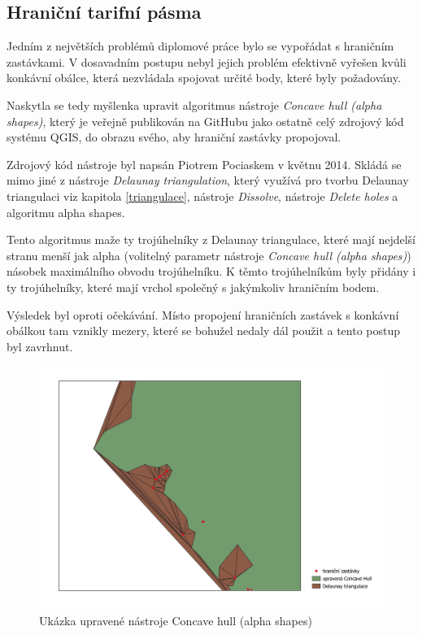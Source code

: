 \subsection{Hraniční tarifní pásma}
\label{hranice}

Jedním z největších problémů diplomové práce bylo se vypořádat s hraničním zastávkami.
V dosavadním postupu nebyl jejich problém efektivně vyřešen kvůli konkávní obálce,
která nezvládala spojovat určité body, které byly požadovány.

Naskytla se tedy myšlenka upravit algoritmus nástroje \textit{Concave hull (alpha shapes)},
který je veřejně publikován na GitHubu jako ostatně celý zdrojový kód systému QGIS, do obrazu
svého, aby hraniční zastávky propojoval. 

Zdrojový kód nástroje byl napsán Piotrem Pociaskem v květnu 2014. Skládá se mimo jiné z nástroje
\textit{Delaunay triangulation}, který využívá pro tvorbu Delaunay triangulaci viz kapitola \ref{triangulace},
nástroje \textit{Dissolve}, nástroje \textit{Delete holes} a algoritmu alpha shapes.

Tento algoritmus maže ty trojúhelníky z Delaunay triangulace, které mají nejdelší stranu menší jak alpha (volitelný
parametr nástroje \textit{Concave hull (alpha shapes)}) násobek maximálního obvodu trojúhelníku.
K těmto trojúhelníkům byly přidány i ty trojúhelníky, které mají vrchol společný s jakýmkoliv hraničním bodem.

Výsledek byl oproti očekávání. Místo propojení hraničních zastávek s konkávní obálkou tam vznikly mezery, 
které se bohužel nedaly dál použit a tento postup byl zavrhnut.

\begin{figure}[H] \centering
    \includegraphics[width=400pt]{./pictures/concave_hull_upravena.png}
    \caption[Ukázka upravené nástroje Concave hull (alpha shapes)]{Ukázka upravené nástroje Concave hull (alpha shapes)}
	\label{fig:concave_hull_upravena}              
\end{figure}


